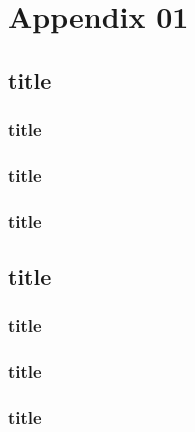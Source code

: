 \chapter{Appendix 01}
\lipsum[2]

\section{title}
\lipsum[1-3]
\subsection{title}
\lipsum[1-3]
\subsection{title}
\lipsum[1-3]
\subsection{title}
\lipsum[1-3]
\section{title}
\lipsum[1-3]
\subsection{title}
\lipsum[1-3]
\subsection{title}
\lipsum[1-3]
\subsection{title}
\lipsum[1-3]